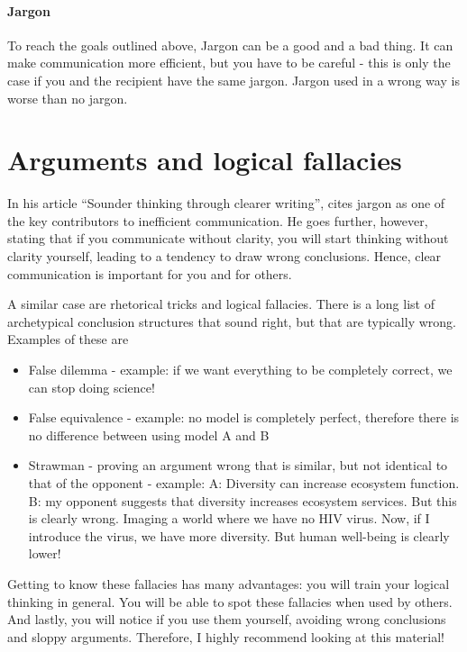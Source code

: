 \documentclass{tufte-book}
\begin{document}
\paragraph{Jargon} To reach the goals outlined above, Jargon can be a good and a bad thing. It can make communication more efficient, but you have to be careful - this is only the case if you and the recipient have the same jargon. Jargon used in a wrong way is worse than no jargon.



\section{Arguments and logical fallacies}\label{ch: arguments and logicical fallacies}

In his article ``Sounder thinking through clearer writing'', \citet{Woodford-Sounderthinkingthrough-1967} cites jargon as one of the key contributors to inefficient communication. He goes further, however, stating that if you communicate without clarity, you will start thinking without clarity yourself, leading to a tendency to draw wrong conclusions. Hence, clear communication is important for you and for others.


A similar case are rhetorical tricks and logical fallacies. There is a long list of archetypical conclusion structures that sound right, but that are typically wrong. Examples of these are

\begin{itemize}
\item False dilemma - example: if we want everything to be completely correct, we can stop doing science!
\item False equivalence - example: no model is completely perfect, therefore there is no difference between using model A and B
\item Strawman - proving an argument wrong that is similar, but not identical to that of the opponent -  example: A: Diversity can increase ecosystem function. B: my opponent suggests that diversity increases ecosystem services. But this is clearly wrong. Imaging a world where we have no HIV virus. Now, if I introduce the virus, we have more diversity. But human well-being is clearly lower!
\end{itemize}

Getting to know these fallacies has many advantages: you will train your logical thinking in general. You will be able to spot these fallacies when used by others. And lastly, you will notice if you use them yourself, avoiding wrong conclusions and sloppy arguments. Therefore, I highly recommend looking at this material!
\end{document}
